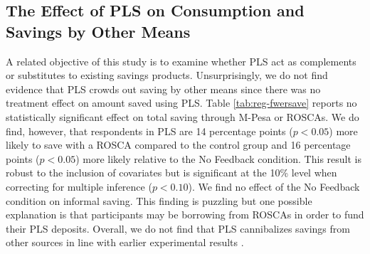 \documentclass[11pt]{article}
\begin{document}




	\subsection{The Effect of PLS on Consumption and Savings by Other Means}

		A related objective of this study is to examine whether PLS act as complements or substitutes to existing savings products. Unsurprisingly, we do not find evidence that PLS crowds out saving by other means since there was no treatment effect on amount saved using PLS. Table \ref{tab:reg-fwersave} reports no statistically significant effect on total saving through M-Pesa or ROSCAs. We do find, however, that respondents in PLS are 14 percentage points ($p < 0.05$) more likely to save with a ROSCA compared to the control group and 16 percentage points ($p < 0.05$) more likely relative to the No Feedback condition. This result is robust to the inclusion of covariates but is significant at the 10\% level when correcting for multiple inference ($p < 0.10$). We find no effect of the No Feedback condition on informal saving. This finding is puzzling but one possible explanation is that participants may be borrowing from ROSCAs in order to fund their PLS deposits. Overall, we do not find that PLS cannibalizes savings from other sources in line with earlier experimental results \parencite{atalay_savings_2014,filiz-ozbay_lottery_2015,dizon_leveraging_2016}.
\end{document}
